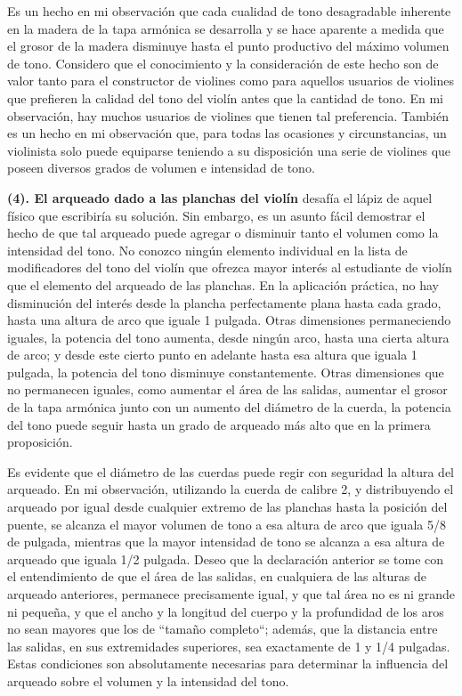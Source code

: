 \documentclass[12pt]{book}
\begin{document}
Es un hecho en mi observación que cada cualidad de tono desagradable inherente en la madera de la tapa armónica se desarrolla y se hace aparente a medida que el grosor de la madera disminuye hasta el punto productivo del máximo volumen de tono. Considero que el conocimiento y la consideración de este hecho son de valor tanto para el constructor de violines como para aquellos usuarios de violines que prefieren la calidad del tono del violín antes que la cantidad de tono. En mi observación, hay muchos usuarios de violines que tienen tal preferencia. También es un hecho en mi observación que, para todas las ocasiones y circunstancias, un violinista solo puede equiparse teniendo a su disposición una serie de violines que poseen diversos grados de volumen e intensidad de tono.

\textbf{(4). El arqueado dado a las planchas del violín} desafía el lápiz de aquel físico que escribiría su solución. Sin embargo, es un asunto fácil demostrar el hecho de que tal arqueado puede agregar o disminuir tanto el volumen como la intensidad del tono. No conozco ningún elemento individual en la lista de modificadores del tono del violín que ofrezca mayor interés al estudiante de violín que el elemento del arqueado de las planchas. En la aplicación práctica, no hay disminución del interés desde la plancha perfectamente plana hasta cada grado, hasta una altura de arco que iguale 1 pulgada. Otras dimensiones permaneciendo iguales, la potencia del tono aumenta, desde ningún arco, hasta una cierta altura de arco; y desde este cierto punto en adelante hasta esa altura que iguala 1 pulgada, la potencia del tono disminuye constantemente. Otras dimensiones que no permanecen iguales, como aumentar el área de las salidas, aumentar el grosor de la tapa armónica junto con un aumento del diámetro de la cuerda, la potencia del tono puede seguir hasta un grado de arqueado más alto que en la primera proposición.

Es evidente que el diámetro de las cuerdas puede regir con seguridad la altura del arqueado. En mi observación, utilizando la cuerda de calibre 2, y distribuyendo el arqueado por igual desde cualquier extremo de las planchas hasta la posición del puente, se alcanza el mayor volumen de tono a esa altura de arco que iguala 5/8 de pulgada, mientras que la mayor intensidad de tono se alcanza a esa altura de arqueado que iguala 1/2 pulgada. Deseo que la declaración anterior se tome con el entendimiento de que el área de las salidas, en cualquiera de las alturas de arqueado anteriores, permanece precisamente igual, y que tal área no es ni grande ni pequeña, y que el ancho y la longitud del cuerpo y la profundidad de los aros no sean mayores que los de ``tamaño completo``; además, que la distancia entre las salidas, en sus extremidades superiores, sea exactamente de 1 y 1/4 pulgadas. Estas condiciones son absolutamente necesarias para determinar la influencia del arqueado sobre el volumen y la intensidad del tono.
\end{document}
